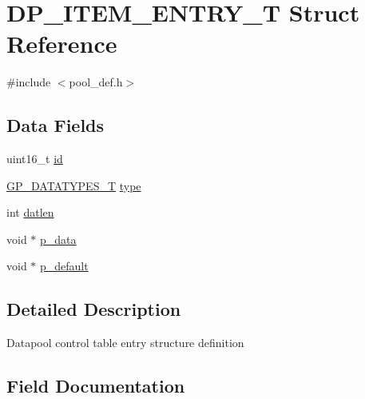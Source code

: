 \hypertarget{structDP__ITEM__ENTRY__T}{}\section{D\+P\+\_\+\+I\+T\+E\+M\+\_\+\+E\+N\+T\+R\+Y\+\_\+T Struct Reference}
\label{structDP__ITEM__ENTRY__T}


{\ttfamily \#include $<$pool\+\_\+def.\+h$>$}

\subsection*{Data Fields}
\begin{DoxyCompactItemize}
\item 
uint16\+\_\+t \mbox{\hyperlink{structDP__ITEM__ENTRY__T_a525a94ac478ae3e25277ac3c0010840b}{id}}
\item 
\mbox{\hyperlink{gp__types_8h_acd9c75cdf141e6e507d4802cece61205}{G\+P\+\_\+\+D\+A\+T\+A\+T\+Y\+P\+E\+S\+\_\+T}} \mbox{\hyperlink{structDP__ITEM__ENTRY__T_a56ac58b2ffeabb229c2741eb133d3ad9}{type}}
\item 
int \mbox{\hyperlink{structDP__ITEM__ENTRY__T_a30f4931e415647d4adcad37e9472e4f5}{datlen}}
\item 
void $\ast$ \mbox{\hyperlink{structDP__ITEM__ENTRY__T_a36a97b74697546b392b8c03375c3f3fb}{p\+\_\+data}}
\item 
void $\ast$ \mbox{\hyperlink{structDP__ITEM__ENTRY__T_a852f1818d9497e3454f648dcc628da4e}{p\+\_\+default}}
\end{DoxyCompactItemize}


\subsection{Detailed Description}
Datapool control table entry structure definition 

\subsection{Field Documentation}
\mbox{\label{structDP__ITEM__ENTRY__T_a30f4931e415647d4adcad37e9472e4f5}} 
